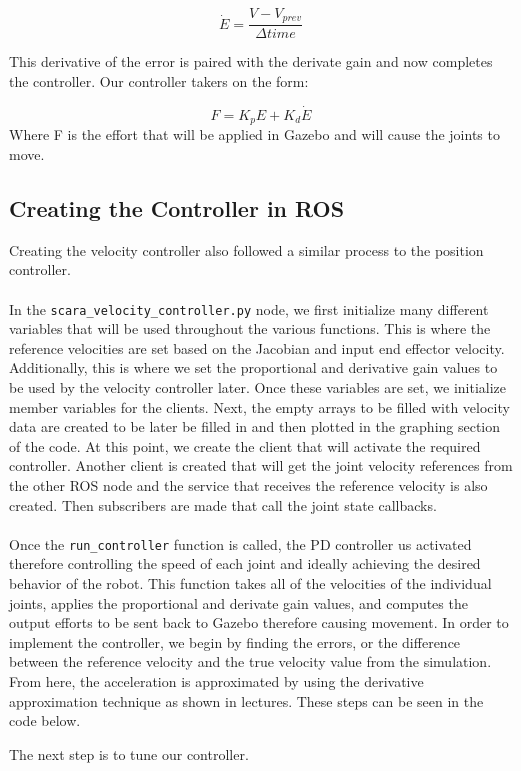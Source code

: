 \documentclass{article}
\begin{document}
\[
    \dot{E} = \frac{V - V_{prev}}{\Delta time}
\]

This derivative of the error is paired with the derivate gain and now completes the controller. Our controller takers on the form: 

\[
    F = K_p E + K_d \dot{E}
\]
Where F is the effort that will be applied in Gazebo and will cause the joints to move.
\vspace{0.25in}
\subsection{Creating the Controller in ROS}
\vspace{0.15in}
Creating the velocity controller also followed a similar process to the position 
controller.\\
\vspace{0in}\\
In the \lstinline{scara_velocity_controller.py} node, we first 
initialize many
 different variables that will be used throughout the various
  functions. This is where the reference velocities are set based
   on the Jacobian and input end effector velocity.
    Additionally, this is where we set the proportional and
     derivative gain values to be used by the 
velocity controller later. Once these variables are set, 
we initialize member variables for the
clients. Next, the empty arrays to be filled with velocity 
data are created to be later be filled in and then 
plotted in the graphing section of the code. 
At this point, we create the client that will activate 
the required controller. Another client is created that will 
get the joint velocity references from the other 
ROS node and the service that receives the reference velocity is also 
created. Then subscribers are made that call the joint state callbacks.\\
\vspace{0in}\\
Once the \lstinline{run_controller} function is called, the PD controller us activated 
therefore controlling the speed of each joint and ideally achieving the desired 
behavior of the robot. This function takes all of the velocities of the individual 
joints, applies the proportional and derivate gain values, and computes the output 
efforts to be sent back to Gazebo therefore causing movement. In order to 
implement the controller, we begin by finding the errors, or the 
difference between the reference velocity and the true velocity value from the 
simulation. From here, the acceleration is approximated by using 
the derivative approximation technique as shown in lectures.
 These steps can be seen in the code below.

The next step is to tune our controller.
\end{document}
